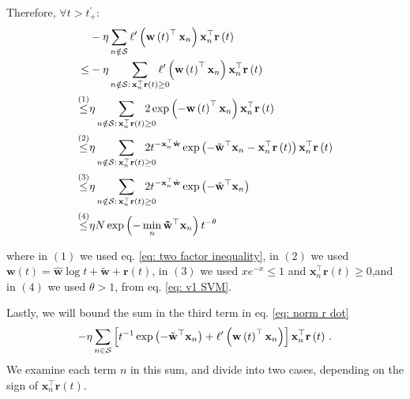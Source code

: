 \documentclass[twoside,11pt,english]{article}
\begin{document}
Therefore, $\forall t>t_{+}^{\prime}$: 
\begin{align}
 & -\eta\sum_{n\notin\set}\ell^{\prime}\left(\mathbf{w}\left(t\right)^{\top}\mathbf{x}_{n}\right)\mathbf{x}_{n}^{\top}\mathbf{r}\left(t\right)\nonumber \\
\leq & -\eta\sum_{n\notin\set:\,\mathbf{x}_{n}^{\top}\mathbf{r}\left(t\right)\geq0}\!\!\!\!\!\!\!\ell^{\prime}\left(\mathbf{w}\left(t\right)^{\top}\mathbf{x}_{n}\right)\mathbf{x}_{n}^{\top}\mathbf{r}\left(t\right)\nonumber \\
\overset{\left(1\right)}{\leq} & \eta\sum_{n\notin\set:\,\mathbf{x}_{n}^{\top}\mathbf{r}\left(t\right)\geq0}\!\!\!\!\!\!\!2\exp\left(-\mathbf{w}\left(t\right)^{\top}\mathbf{x}_{n}\right)\mathbf{x}_{n}^{\top}\mathbf{r}\left(t\right)\nonumber \\
\overset{\left(2\right)}{\leq} & \eta\sum_{n\notin\set:\,\mathbf{x}_{n}^{\top}\mathbf{r}\left(t\right)\geq0}\!\!\!\!\!\!\!2t^{-\mathbf{x}_{n}^{\top}\hat{\mathbf{w}}}\exp\left(-\tilde{\mathbf{w}}^{\top}\mathbf{x}_{n}-\mathbf{x}_{n}^{\top}\mathbf{r}\left(t\right)\right)\mathbf{x}_{n}^{\top}\mathbf{r}\left(t\right)\nonumber \\
\overset{\left(3\right)}{\leq} & \eta\sum_{n\notin\set:\,\mathbf{x}_{n}^{\top}\mathbf{r}\left(t\right)\geq0}\!\!\!\!\!\!\!2t^{-\mathbf{x}_{n}^{\top}\hat{\mathbf{w}}}\exp\left(-\tilde{\mathbf{w}}^{\top}\mathbf{x}_{n}\right)\nonumber \\
\overset{\left(4\right)}{\leq} & \eta N\exp\left(-\min_{n}\mathbf{\tilde{w}}{}^{\top}\mathbf{x}_{n}\right)t^{-\theta} \label{eq: bound on non-SV gradient}
\end{align}

where in $\left(1\right)$ we used eq. \ref{eq: two factor inequality}, in
$\left(2\right)$ we used $\mathbf{w}\left(t\right)=\hat{\mathbf{w}}\log t+\tilde{\mathbf{w}}+\mathbf{r}\left(t\right)$,
in $\left(3\right)$ we used $xe^{-x}\leq1$ and $\mathbf{x}_{n}^{\top}\mathbf{r}\left(t\right)\geq0$,and
in $\left(4\right)$ we used $\theta>1$, from eq. \ref{eq: v1 SVM}.

Lastly, we will  bound the sum in the third term in eq. \ref{eq: norm r dot}
\begin{equation}
-\eta\sum_{n\in\mathcal{S}}\left[t^{-1}\exp\left(-\tilde{\mathbf{w}}^{\top}\mathbf{x}_{n}\right)+\ell^{\prime}\left(\mathbf{w}\left(t\right)^{\top}\mathbf{x}_{n}\right)\right]\mathbf{x}_{n}^{\top}\mathbf{r}\left(t\right)\,.\label{eq: minimum over S1 tilde}
\end{equation}
We examine each term $n$ in this sum, and divide into two cases,
depending on the sign of $\mathbf{x}_{n}^{\top}\mathbf{r}\left(t\right)$.
\end{document}
